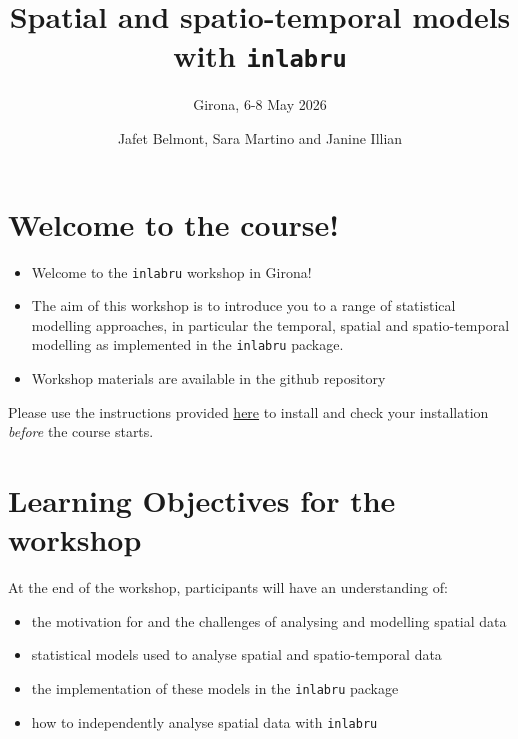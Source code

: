 \documentclass[
  letterpaper,
  DIV=11,
  numbers=noendperiod]{scrartcl}
\title{Spatial and spatio-temporal models with \texttt{inlabru}}
\subtitle{Girona, 6-8 May 2026}
\author{Jafet Belmont, Sara Martino and Janine Illian}
\date{}
\makeatletter
\providecommand{\tightlist}{%
  \setlength{\itemsep}{0pt}\setlength{\parskip}{0pt}}
\renewcommand{\maketitle}{\bgroup\setlength{\parindent}{0pt}
\begin{flushleft}
  {\sffamily\huge\textbf{\MakeUppercase{\@title}}} \vspace{0.3cm} \newline
  {\Large {\@subtitle}} \newline
  \@author
\end{flushleft}\egroup
}
\makeatother
\begin{document}
\maketitle

\pagestyle{mystyle}


\section{Welcome to the course!}\label{welcome-to-the-course}

\begin{itemize}
\tightlist
\item
  Welcome to the \texttt{inlabru} workshop in Girona!
\item
  The aim of this workshop is to introduce you to a range of statistical
  modelling approaches, in particular the temporal, spatial and
  spatio-temporal modelling as implemented in the \texttt{inlabru}
  package.
\item
  Workshop materials are available in the github repository
\end{itemize}

\begin{tcolorbox}[enhanced jigsaw, left=2mm, arc=.35mm, breakable, rightrule=.15mm, toprule=.15mm, opacitybacktitle=0.6, titlerule=0mm, title=\textcolor{quarto-callout-warning-color}{\faExclamationTriangle}\hspace{0.5em}{Important! ⚠️}, colback=white, bottomtitle=1mm, colbacktitle=quarto-callout-warning-color!10!white, toptitle=1mm, colframe=quarto-callout-warning-color-frame, leftrule=.75mm, bottomrule=.15mm, coltitle=black, opacityback=0]

Please use the instructions provided \href{Install_software.qmd}{here}
to install and check your installation \emph{before} the course starts.

\end{tcolorbox}

\section{Learning Objectives for the
workshop}\label{learning-objectives-for-the-workshop}

At the end of the workshop, participants will have an understanding of:

\begin{itemize}
\tightlist
\item
  the motivation for and the challenges of analysing and modelling
  spatial data
\item
  statistical models used to analyse spatial and spatio-temporal data
\item
  the implementation of these models in the \texttt{inlabru} package
\item
  how to independently analyse spatial data with \texttt{inlabru}
\end{itemize}
\end{document}
